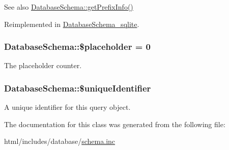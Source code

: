 \begin{DoxySeeAlso}{See also}
\hyperlink{classDatabaseSchema_a8acae6a4bd3e5ba89aaddc8133927ee2}{DatabaseSchema::getPrefixInfo()} 
\end{DoxySeeAlso}


Reimplemented in \hyperlink{classDatabaseSchema__sqlite_ab0f2d6c0731bffc8a88b64cad3a60a3f}{DatabaseSchema\_\-sqlite}.\hypertarget{classDatabaseSchema_a113f21a5dcec8719b09a09d422a9dfc9}{
\subsubsection[{\$placeholder}]{\setlength{\rightskip}{0pt plus 5cm}DatabaseSchema::\$placeholder = 0}}
\label{classDatabaseSchema_a113f21a5dcec8719b09a09d422a9dfc9}
The placeholder counter. \hypertarget{classDatabaseSchema_ab8e3b674c237c9f4590c38d6ebf8a3d1}{
\subsubsection[{\$uniqueIdentifier}]{\setlength{\rightskip}{0pt plus 5cm}DatabaseSchema::\$uniqueIdentifier}}
\label{classDatabaseSchema_ab8e3b674c237c9f4590c38d6ebf8a3d1}
A unique identifier for this query object. 

The documentation for this class was generated from the following file:\begin{DoxyCompactItemize}
\item 
html/includes/database/\hyperlink{schema_8inc}{schema.inc}\end{DoxyCompactItemize}
